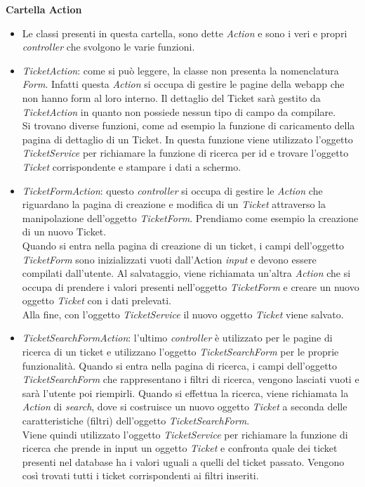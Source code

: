 \textbf{Cartella Action} 
\begin{itemize}
\item[] Le classi presenti in questa cartella, sono dette \textit{Action} e sono i veri e propri \textit{controller} che svolgono le varie funzioni.

\item \textit{TicketAction}: come si può leggere, la classe non presenta la nomenclatura \textit{Form}. Infatti questa \textit{Action} si occupa di gestire le pagine della webapp che non hanno form al loro interno. Il dettaglio del Ticket sarà gestito da \textit{TicketAction} in quanto non possiede nessun tipo di campo da compilare.\\
Si trovano diverse funzioni, come ad esempio la funzione di caricamento della pagina di dettaglio di un Ticket. In questa funzione viene utilizzato l'oggetto \textit{TicketService} per richiamare la funzione di ricerca per id e trovare l'oggetto \textit{Ticket} corrispondente e stampare i dati a schermo.

\item \textit{TicketFormAction}: questo \textit{controller} si occupa di gestire le \textit{Action} che riguardano la pagina di creazione e modifica di un \textit{Ticket} attraverso la manipolazione dell'oggetto \textit{TicketForm}. Prendiamo come esempio la creazione di un nuovo Ticket.\\
Quando si entra nella pagina di creazione di un ticket, i campi dell'oggetto \textit{TicketForm} sono inizializzati vuoti dall'Action \textit{input} e devono essere compilati dall'utente. Al salvataggio, viene richiamata un'altra \textit{Action} che si occupa di prendere i valori presenti nell'oggetto \textit{TicketForm} e creare un nuovo oggetto \textit{Ticket} con i dati prelevati.\\ Alla fine, con l'oggetto \textit{TicketService} il nuovo oggetto \textit{Ticket} viene salvato. 

\item \textit{TicketSearchFormAction}: l'ultimo \textit{controller} è utilizzato per le pagine di ricerca di un ticket e utilizzano l'oggetto \textit{TicketSearchForm} per le proprie funzionalità. Quando si entra nella pagina di ricerca, i campi dell'oggetto \textit{TicketSearchForm} che rappresentano i filtri di ricerca, vengono lasciati vuoti e sarà l'utente poi riempirli. Quando si effettua la ricerca, viene richiamata la \textit{Action} di \textit{search}, dove si costruisce un nuovo oggetto \textit{Ticket} a seconda delle caratteristiche (filtri) dell'oggetto \textit{TicketSearchForm}. \\
Viene quindi utilizzato l'oggetto \textit{TicketService} per richiamare la funzione di ricerca che prende in input un oggetto \textit{Ticket} e confronta quale dei ticket presenti nel database ha i valori uguali a quelli del ticket passato. Vengono così trovati tutti i ticket corrispondenti ai filtri inseriti.
\end{itemize}

